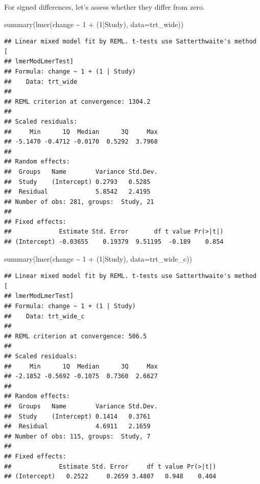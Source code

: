 \documentclass[
]{article}
\newenvironment{Shaded}{\begin{snugshade}}{\end{snugshade}}
\newcommand{\AttributeTok}[1]{\textcolor[rgb]{0.77,0.63,0.00}{#1}}
\newcommand{\DecValTok}[1]{\textcolor[rgb]{0.00,0.00,0.81}{#1}}
\newcommand{\FunctionTok}[1]{\textcolor[rgb]{0.00,0.00,0.00}{#1}}
\newcommand{\NormalTok}[1]{#1}
\newcommand{\SpecialCharTok}[1]{\textcolor[rgb]{0.00,0.00,0.00}{#1}}
\begin{document}
For signed differences, let's assess whether they differ from zero.

\begin{Shaded}
\begin{Highlighting}[]
\FunctionTok{summary}\NormalTok{(}\FunctionTok{lmer}\NormalTok{(change }\SpecialCharTok{\textasciitilde{}} \DecValTok{1} \SpecialCharTok{+}\NormalTok{ (}\DecValTok{1}\SpecialCharTok{|}\NormalTok{Study), }\AttributeTok{data=}\NormalTok{trt\_wide))}
\end{Highlighting}
\end{Shaded}

\begin{verbatim}
## Linear mixed model fit by REML. t-tests use Satterthwaite's method [
## lmerModLmerTest]
## Formula: change ~ 1 + (1 | Study)
##    Data: trt_wide
## 
## REML criterion at convergence: 1304.2
## 
## Scaled residuals: 
##     Min      1Q  Median      3Q     Max 
## -5.1470 -0.4712 -0.0170  0.5292  3.7968 
## 
## Random effects:
##  Groups   Name        Variance Std.Dev.
##  Study    (Intercept) 0.2793   0.5285  
##  Residual             5.8542   2.4195  
## Number of obs: 281, groups:  Study, 21
## 
## Fixed effects:
##             Estimate Std. Error       df t value Pr(>|t|)
## (Intercept) -0.03655    0.19379  9.51195  -0.189    0.854
\end{verbatim}

\begin{Shaded}
\begin{Highlighting}[]
\FunctionTok{summary}\NormalTok{(}\FunctionTok{lmer}\NormalTok{(change }\SpecialCharTok{\textasciitilde{}} \DecValTok{1} \SpecialCharTok{+}\NormalTok{ (}\DecValTok{1}\SpecialCharTok{|}\NormalTok{Study), }\AttributeTok{data=}\NormalTok{trt\_wide\_c))}
\end{Highlighting}
\end{Shaded}

\begin{verbatim}
## Linear mixed model fit by REML. t-tests use Satterthwaite's method [
## lmerModLmerTest]
## Formula: change ~ 1 + (1 | Study)
##    Data: trt_wide_c
## 
## REML criterion at convergence: 506.5
## 
## Scaled residuals: 
##     Min      1Q  Median      3Q     Max 
## -2.1852 -0.5692 -0.1075  0.7360  2.6627 
## 
## Random effects:
##  Groups   Name        Variance Std.Dev.
##  Study    (Intercept) 0.1414   0.3761  
##  Residual             4.6911   2.1659  
## Number of obs: 115, groups:  Study, 7
## 
## Fixed effects:
##             Estimate Std. Error     df t value Pr(>|t|)
## (Intercept)   0.2522     0.2659 3.4807   0.948    0.404
\end{verbatim}
\end{document}
